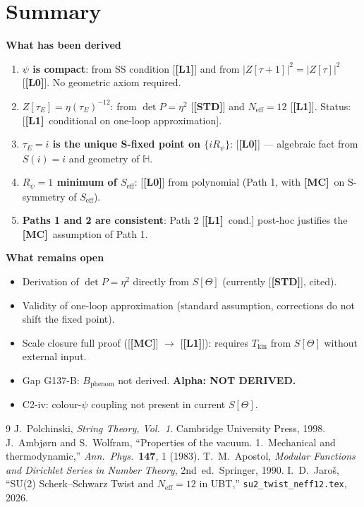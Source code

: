 \documentclass[12pt,a4paper]{article}
\theoremstyle{definition}\newtheorem{definition}[theorem]{Definition}
\theoremstyle{remark}\newtheorem{remark}[theorem]{Remark}
\newcommand{\Lz}{\textbf{[L0]}}
\newcommand{\Lo}{\textbf{[L1]}}
\newcommand{\MC}{\textbf{[MC]}}
\newcommand{\STD}{\textbf{[STD]}}
\begin{document}
\section{Summary}
\label{sec:summary}

\begin{insightbox}
\textbf{What has been derived}

\begin{enumerate}
\item \textbf{$\psi$ is compact}: from SS condition [\Lo] and from
  $|Z[\tau+1]|^2=|Z[\tau]|^2$ [\Lz].  No geometric axiom required.
\item \textbf{$Z[\tau_E]=\eta(\tau_E)^{-12}$}: from
  $\det P=\eta^2$ [\STD] and $N_{\mathrm{eff}}=12$ [\Lo].
  Status: [\Lo\ conditional on one-loop approximation].
\item \textbf{$\tau_E=i$ is the unique S-fixed point on $\{iR_\psi\}$}:
  [\Lz] — algebraic fact from $S(i)=i$ and geometry of $\mathbb{H}$.
\item \textbf{$R_\psi=1$ minimum of $S_{\mathrm{eff}}$}: [\Lz] from
  polynomial (Path 1, with \MC\ on S-symmetry of $S_{\mathrm{eff}}$).
\item \textbf{Paths 1 and 2 are consistent}: Path 2 [\Lo\ cond.]
  post-hoc justifies the \MC\ assumption of Path 1.
\end{enumerate}

\textbf{What remains open}
\begin{itemize}
\item Derivation of $\det P=\eta^2$ directly from $S[\Theta]$
  (currently [\STD], cited).
\item Validity of one-loop approximation (standard assumption,
  corrections do not shift the fixed point).
\item Scale closure full proof ([\MC] $\to$ [\Lo]):
  requires $T_{\mathrm{kin}}$ from $S[\Theta]$ without external input.
\item Gap G137-B: $B_{\mathrm{phenom}}$ not derived.
  \textbf{Alpha: NOT DERIVED.}
\item C2-iv: colour-$\psi$ coupling not present in current $S[\Theta]$.
\end{itemize}
\end{insightbox}

\begin{thebibliography}{9}
  J.~Polchinski, \textit{String Theory, Vol.~1}.
  Cambridge University Press, 1998.
  J.~Ambj\o{}rn and S.~Wolfram,
  ``Properties of the vacuum. 1.\ Mechanical and thermodynamic,''
  \textit{Ann.\ Phys.}\ \textbf{147}, 1 (1983).
  T.~M.~Apostol, \textit{Modular Functions and Dirichlet Series
  in Number Theory}, 2nd~ed.\ Springer, 1990.
  I.~D.~Jaroš, ``SU(2) Scherk--Schwarz Twist and
  $N_{\mathrm{eff}}=12$ in UBT,''
  \texttt{su2\_twist\_neff12.tex}, 2026.
\end{thebibliography}
\end{document}
